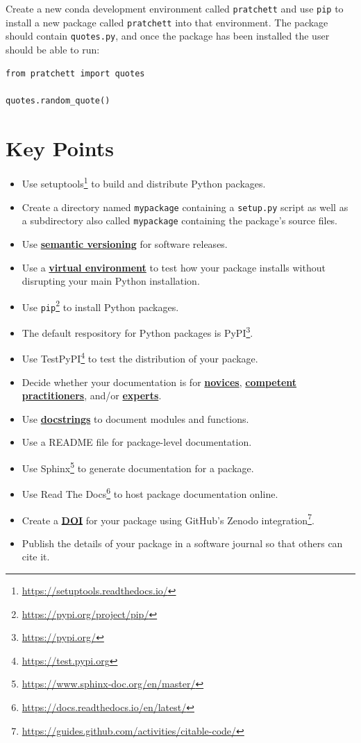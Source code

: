 \documentclass[
]{krantz}
\providecommand{\tightlist}{%
  \setlength{\itemsep}{0pt}\setlength{\parskip}{0pt}}
\renewcommand{\href}[2]{#2\footnote{\url{#1}}}
\newcommand{\gref}[2]{\hyperlink{#2}{\textbf{#1}}}
\begin{document}
Create a new conda development environment called \texttt{pratchett}
and use \texttt{pip} to install a new package called \texttt{pratchett} into that environment.
The package should contain \texttt{quotes.py},
and once the package has been installed the user should be able to run:

\begin{verbatim}
from pratchett import quotes

quotes.random_quote()
\end{verbatim}

\hypertarget{packaging-keypoints}{%
\section{Key Points}\label{packaging-keypoints}}

\begin{itemize}
\tightlist
\item
  Use \href{https://setuptools.readthedocs.io/}{setuptools} to build and distribute Python packages.
\item
  Create a directory named \texttt{mypackage} containing a \texttt{setup.py} script
  as well as a subdirectory also called \texttt{mypackage} containing the package's source files.
\item
  Use \gref{semantic versioning}{semantic\_versioning} for software releases.
\item
  Use a \gref{virtual environment}{virtual\_environment} to test how your package installs
  without disrupting your main Python installation.\\
\item
  Use \href{https://pypi.org/project/pip/}{\texttt{pip}} to install Python packages.
\item
  The default respository for Python packages is \href{https://pypi.org/}{PyPI}.
\item
  Use \href{https://test.pypi.org}{TestPyPI} to test the distribution of your package.
\item
  Decide whether your documentation is for \gref{novices}{novice},
  \gref{competent practitioners}{competent\_practitioner}, and/or \gref{experts}{expert}.
\item
  Use \gref{docstrings}{docstring} to document modules and functions.
\item
  Use a README file for package-level documentation.
\item
  Use \href{https://www.sphinx-doc.org/en/master/}{Sphinx} to generate documentation for a package.
\item
  Use \href{https://docs.readthedocs.io/en/latest/}{Read The Docs} to host package documentation online.
\item
  Create a \gref{DOI}{doi} for your package using \href{https://guides.github.com/activities/citable-code/}{GitHub's Zenodo integration}.
\item
  Publish the details of your package in a software journal so that others can cite it.
\end{itemize}
\end{document}
